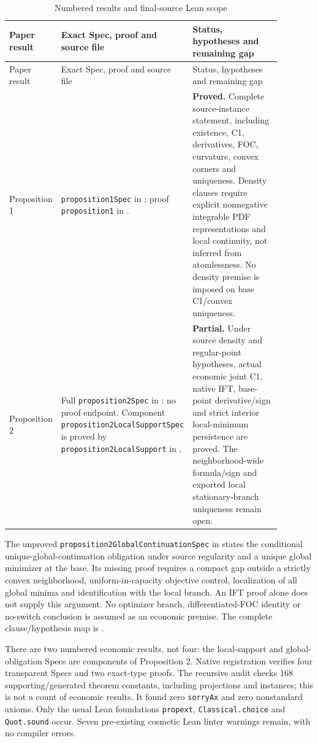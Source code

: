\documentclass[11pt]{article}
\theoremstyle{definition}
\begin{document}
\begin{longtable}{P{0.16\linewidth}P{0.36\linewidth}P{0.36\linewidth}}
\caption{Numbered results and final-source Lean scope}\\
\toprule Paper result & Exact Spec, proof and source file & Status, hypotheses and remaining gap\\ \midrule
\endfirsthead
\toprule Paper result & Exact Spec, proof and source file & Status, hypotheses and remaining gap\\ \midrule
\endhead
Proposition 1 & \texttt{proposition1Spec} in ; proof \texttt{proposition1} in . & \textbf{Proved.} Complete source-instance statement, including existence, C1, derivatives, FOC, curvature, convex corners and uniqueness. Density clauses require explicit nonnegative integrable PDF representations and local continuity, not inferred from atomlessness. No density premise is imposed on base C1/convex uniqueness.\\
Proposition 2 & Full \texttt{proposition2Spec} in : no proof endpoint. Component \texttt{proposition2LocalSupportSpec} is proved by \texttt{proposition2LocalSupport} in . & \textbf{Partial.} Under source density and regular-point hypotheses, actual economic joint C1, native IFT, base-point derivative/sign and strict interior local-minimum persistence are proved. The neighborhood-wide formula/sign and exported local stationary-branch uniqueness remain open.\\
\bottomrule
\end{longtable}

The unproved \texttt{proposition2GlobalContinuationSpec} in  states the conditional unique-global-continuation obligation under source regularity and a unique global minimizer at the base. Its missing proof requires a compact gap outside a strictly convex neighborhood, uniform-in-capacity objective control, localization of all global minima and identification with the local branch. An IFT proof alone does not supply this argument. No optimizer branch, differentiated-FOC identity or no-switch conclusion is assumed as an economic premise. The complete clause/hypothesis map is .

There are two numbered economic results, not four: the local-support and global-obligation Specs are components of Proposition 2. Native registration verifies four transparent Specs and two exact-type proofs. The recursive audit checks 168 supporting/generated theorem constants, including projections and instances; this is not a count of economic results. It found zero \texttt{sorryAx} and zero nonstandard axioms. Only the usual Lean foundations \texttt{propext}, \texttt{Classical.choice} and \texttt{Quot.sound} occur. Seven pre-existing cosmetic Lean linter warnings remain, with no compiler errors.
\end{document}
